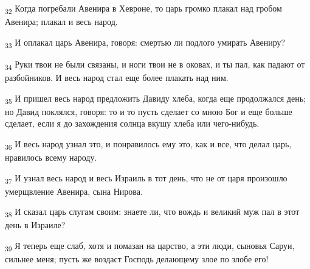 \begin{tcolorbox}
\textsubscript{32} Когда погребали Авенира в Хевроне, то царь громко плакал над гробом Авенира; плакал и весь народ.
\end{tcolorbox}
\begin{tcolorbox}
\textsubscript{33} И оплакал царь Авенира, говоря: смертью ли подлого умирать Авениру?
\end{tcolorbox}
\begin{tcolorbox}
\textsubscript{34} Руки твои не были связаны, и ноги твои не в оковах, и ты пал, как падают от разбойников. И весь народ стал еще более плакать над ним.
\end{tcolorbox}
\begin{tcolorbox}
\textsubscript{35} И пришел весь народ предложить Давиду хлеба, когда еще продолжался день; но Давид поклялся, говоря: то и то пусть сделает со мною Бог и еще больше сделает, если я до захождения солнца вкушу хлеба или чего-нибудь.
\end{tcolorbox}
\begin{tcolorbox}
\textsubscript{36} И весь народ узнал это, и понравилось ему это, как и все, что делал царь, нравилось всему народу.
\end{tcolorbox}
\begin{tcolorbox}
\textsubscript{37} И узнал весь народ и весь Израиль в тот день, что не от царя произошло умерщвление Авенира, сына Нирова.
\end{tcolorbox}
\begin{tcolorbox}
\textsubscript{38} И сказал царь слугам своим: знаете ли, что вождь и великий муж пал в этот день в Израиле?
\end{tcolorbox}
\begin{tcolorbox}
\textsubscript{39} Я теперь еще слаб, хотя и помазан на царство, а эти люди, сыновья Саруи, сильнее меня; пусть же воздаст Господь делающему злое по злобе его!
\end{tcolorbox}
